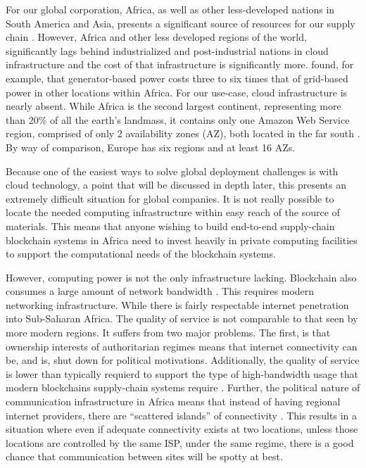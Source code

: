 For our global corporation, Africa, as well as other less-developed nations in South America and Asia, presents a significant source of resources for our supply chain \parencite{woodAfricaExportStructure2001}. However, Africa and other less developed regions of the world, significantly lags behind industrialized and post-industrial nations in cloud infrastructure and the cost of that infrastructure is significantly more. \textcite{mckinseySolvingAfricaInfrastructure} found, for example, that generator-based power costs three to six times that of grid-based power in other locations within Africa. For our use-case, cloud infrastructure is nearly absent. While Africa is the second largest continent, representing more than 20\% of all the earth's landmass, it contains only one Amazon Web Service region, comprised of only 2 availability zones (AZ), both located in the far south \parencite{awsGlobalInfrastructureRegions}. By way of comparison, Europe has six regions and at least 16 AZs.

Because one of the easiest ways to solve global deployment challenges is with cloud technology, a point that will be discussed in depth later, this presents an extremely difficult situation for global companies. It is not really possible to locate the needed computing infrastructure within easy reach of the source of materials. This means that anyone wishing to build end-to-end supply-chain blockchain systems in Africa need to invest heavily in private computing facilities to support the computational needs of the blockchain systems.

However, computing power is not the only infrastructure lacking. Blockchain also consumes a large amount of network bandwidth \parencite{litkeBlockchainsSupplyChain2019}. This requires modern networking infrastructure. While there is fairly respectable internet penetration into Sub-Saharan Africa. The quality of service is not comparable to that seen by more modern regions. It suffers from two major problems. The first, is that ownership interests of authoritarian regimes means that internet connectivity can be, and is, shut down for political motivations. Additionally, the quality of service is lower than typically requierd to support the type of high-bandwidth usage that modern blockchains supply-chain systems require \parencite{freyburgBlockingBottleneckInternet2018}. Further, the political nature of communication infrastructure in Africa means that instead of having regional internet providers, there are ``scattered islands'' of connectivity \parencite{fanouReshapingAfricanInternet2017}. This results in a situation where even if adequate connectivity exists at two locations, unless those locations are controlled by the same ISP, under the same regime, there is a good chance that communication between sites will be spotty at best.

